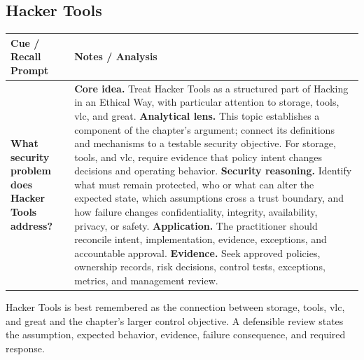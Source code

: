\documentclass[11pt]{article}
\newcommand{\CornellHeader}{%
\rowcolor{Navy}\color{white}\bfseries Cue / Recall Prompt & \color{white}\bfseries Notes / Analysis\\\hline}
\newcommand{\CornellRow}[2]{%
\cellcolor{CueGray}\RaggedRight\textbf{#1} & \RaggedRight #2\\\hline}
\begin{document}
\subsection*{Hacker Tools}
\begin{longtable}{>{\RaggedRight\arraybackslash}p{}|>{\RaggedRight\arraybackslash}p{}}
\CornellHeader
\CornellRow{What security problem does Hacker Tools address?}{\textbf{Core idea.} Treat Hacker Tools as a structured part of Hacking in an Ethical Way, with particular attention to storage, tools, vlc, and great. \textbf{Analytical lens.} This topic establishes a component of the chapter's argument; connect its definitions and mechanisms to a testable security objective. For storage, tools, and vlc, require evidence that policy intent changes decisions and operating behavior. \textbf{Security reasoning.} Identify what must remain protected, who or what can alter the expected state, which assumptions cross a trust boundary, and how failure changes confidentiality, integrity, availability, privacy, or safety. \textbf{Application.} The practitioner should reconcile intent, implementation, evidence, exceptions, and accountable approval. \textbf{Evidence.} Seek approved policies, ownership records, risk decisions, control tests, exceptions, metrics, and management review.}
\end{longtable}
\begin{topicsummary}
Hacker Tools is best remembered as the connection between storage, tools, vlc, and great and the chapter's larger control objective. A defensible review states the assumption, expected behavior, evidence, failure consequence, and required response.
\end{topicsummary}
\end{document}
